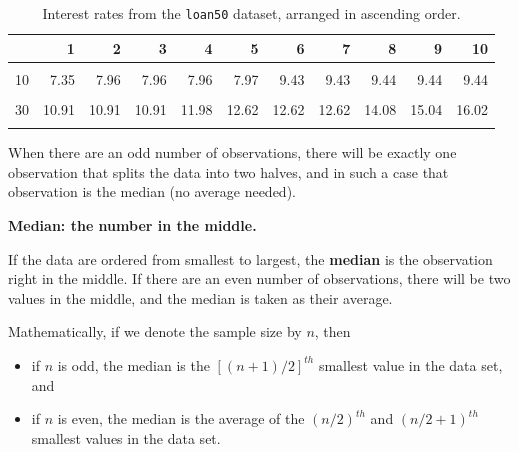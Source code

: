 \documentclass[
  10pt,
  openany]{book}
\providecommand{\tightlist}{%
  \setlength{\itemsep}{0pt}\setlength{\parskip}{0pt}}
\theoremstyle{definition}
\theoremstyle{definition}
\theoremstyle{definition}
\theoremstyle{definition}
\theoremstyle{remark}
\begin{document}
\begin{table}[!h]
\centering
\caption{\label{tab:loan50-int-rate-sorted}Interest rates from the \texttt{loan50} dataset, arranged in ascending order.}
\centering
\begin{tabular}[t]{lrrrrrrrrrr}
\toprule
  & 1 & 2 & 3 & 4 & 5 & 6 & 7 & 8 & 9 & 10\\
\midrule
\cellcolor{gray!10}{1} & \cellcolor{gray!10}{5.31} & \cellcolor{gray!10}{5.31} & \cellcolor{gray!10}{5.32} & \cellcolor{gray!10}{6.08} & \cellcolor{gray!10}{6.08} & \cellcolor{gray!10}{6.08} & \cellcolor{gray!10}{6.71} & \cellcolor{gray!10}{6.71} & \cellcolor{gray!10}{7.34} & \cellcolor{gray!10}{7.35}\\
10 & 7.35 & 7.96 & 7.96 & 7.96 & 7.97 & 9.43 & 9.43 & 9.44 & 9.44 & 9.44\\
\cellcolor{gray!10}{20} & \cellcolor{gray!10}{9.92} & \cellcolor{gray!10}{9.92} & \cellcolor{gray!10}{9.92} & \cellcolor{gray!10}{9.92} & \cellcolor{gray!10}{9.93} & \cellcolor{gray!10}{9.93} & \cellcolor{gray!10}{10.42} & \cellcolor{gray!10}{10.42} & \cellcolor{gray!10}{10.90} & \cellcolor{gray!10}{10.90}\\
30 & 10.91 & 10.91 & 10.91 & 11.98 & 12.62 & 12.62 & 12.62 & 14.08 & 15.04 & 16.02\\
\cellcolor{gray!10}{40} & \cellcolor{gray!10}{17.09} & \cellcolor{gray!10}{17.09} & \cellcolor{gray!10}{17.09} & \cellcolor{gray!10}{18.06} & \cellcolor{gray!10}{18.45} & \cellcolor{gray!10}{19.42} & \cellcolor{gray!10}{20.00} & \cellcolor{gray!10}{21.45} & \cellcolor{gray!10}{24.85} & \cellcolor{gray!10}{26.30}\\
\bottomrule
\end{tabular}
\end{table}

When there are an odd number of observations, there will be exactly one
observation that splits the data into two halves, and in such a case that
observation is the median (no average needed).

\textbf{Median: the number in the middle.}

If the data are ordered from smallest to largest, the \textbf{median} is the observation
right in the middle.
If there are an even number of observations, there will be two values in the
middle, and the median is taken as their average.

Mathematically, if we denote the sample size by \(n\), then

\begin{itemize}
\tightlist
\item
  if \(n\) is odd, the median is the \([(n+1)/2]^{th}\) smallest value in the data set, and
\item
  if \(n\) is even, the median is the average of the \((n/2)^{th}\) and \((n/2+1)^{th}\) smallest values in the data set.
\end{itemize}
\end{document}
